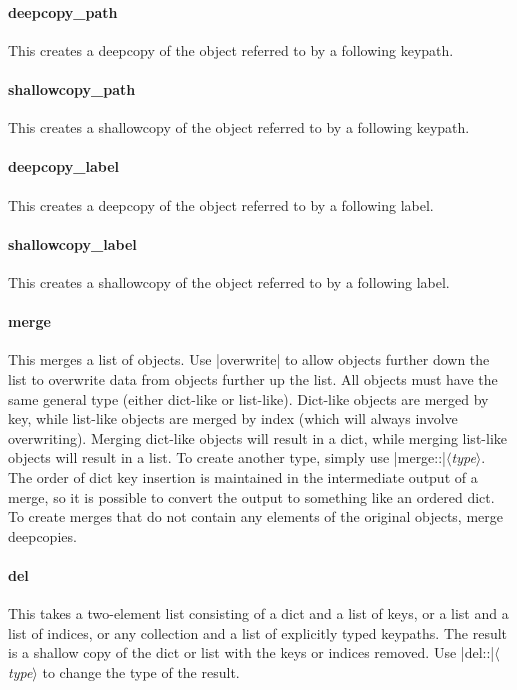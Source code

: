 \documentclass[11pt]{article}
\newcommand{\vmeta}[1]{{\color{DarkRed}\ensuremath{\langle}\textit{#1}\ensuremath{\rangle}}}
\begin{document}
{{\paragraph{deepcopy\_path}
This creates a deepcopy of the object referred to by a following keypath.

\paragraph{shallowcopy\_path}
This creates a shallowcopy of the object referred to by a following keypath.

\paragraph{deepcopy\_label}
This creates a deepcopy of the object referred to by a following label.

\paragraph{shallowcopy\_label}
This creates a shallowcopy of the object referred to by a following label.

\paragraph{merge}
This merges a list of objects.  Use |overwrite| to allow objects further down the list to overwrite data from objects further up the list.  All objects must have the same general type (either dict-like or list-like).  Dict-like objects are merged by key, while list-like objects are merged by index (which will always involve overwriting).  Merging dict-like objects will result in a dict, while merging list-like objects will result in a list.  To create another type, simply use |merge::|\vmeta{type}.  The order of dict key insertion is maintained in the intermediate output of a merge, so it is possible to convert the output to something like an ordered dict.  To create merges that do not contain any elements of the original objects, merge deepcopies.

\paragraph{del}
This takes a two-element list consisting of a dict and a list of keys, or a list and a list of indices, or any collection and a list of explicitly typed keypaths.  The result is a shallow copy of the dict or list with the keys or indices removed.  Use |del::|\vmeta{type} to change the type of the result.

}}
\end{document}
